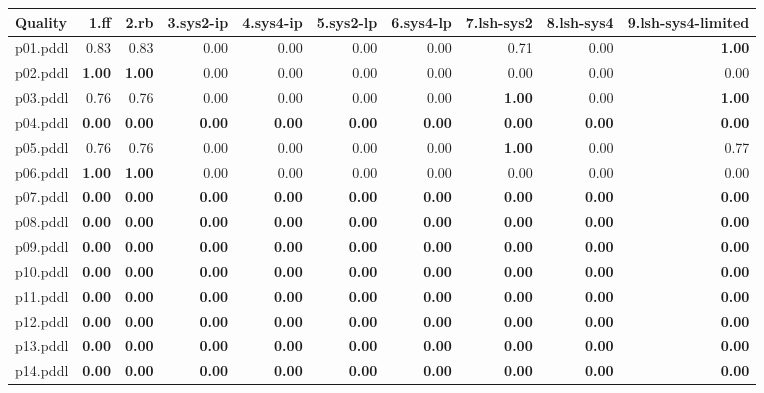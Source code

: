 \documentclass{article}
\begin{document}
\begin{tabular}{@{}lrrrrrrrrr@{}}
Quality & 1.ff & 2.rb & 3.sys2-ip & 4.sys4-ip & 5.sys2-lp & 6.sys4-lp & 7.lsh-sys2 & 8.lsh-sys4 & 9.lsh-sys4-limited \\
\midrule
p01.pddl & 0.83 & 0.83 & 0.00 & 0.00 & 0.00 & 0.00 & 0.71 & 0.00 & \textbf{1.00} \\
p02.pddl & \textbf{1.00} & \textbf{1.00} & 0.00 & 0.00 & 0.00 & 0.00 & 0.00 & 0.00 & 0.00 \\
p03.pddl & 0.76 & 0.76 & 0.00 & 0.00 & 0.00 & 0.00 & \textbf{1.00} & 0.00 & \textbf{1.00} \\
p04.pddl & \textbf{0.00} & \textbf{0.00} & \textbf{0.00} & \textbf{0.00} & \textbf{0.00} & \textbf{0.00} & \textbf{0.00} & \textbf{0.00} & \textbf{0.00} \\
p05.pddl & 0.76 & 0.76 & 0.00 & 0.00 & 0.00 & 0.00 & \textbf{1.00} & 0.00 & 0.77 \\
p06.pddl & \textbf{1.00} & \textbf{1.00} & 0.00 & 0.00 & 0.00 & 0.00 & 0.00 & 0.00 & 0.00 \\
p07.pddl & \textbf{0.00} & \textbf{0.00} & \textbf{0.00} & \textbf{0.00} & \textbf{0.00} & \textbf{0.00} & \textbf{0.00} & \textbf{0.00} & \textbf{0.00} \\
p08.pddl & \textbf{0.00} & \textbf{0.00} & \textbf{0.00} & \textbf{0.00} & \textbf{0.00} & \textbf{0.00} & \textbf{0.00} & \textbf{0.00} & \textbf{0.00} \\
p09.pddl & \textbf{0.00} & \textbf{0.00} & \textbf{0.00} & \textbf{0.00} & \textbf{0.00} & \textbf{0.00} & \textbf{0.00} & \textbf{0.00} & \textbf{0.00} \\
p10.pddl & \textbf{0.00} & \textbf{0.00} & \textbf{0.00} & \textbf{0.00} & \textbf{0.00} & \textbf{0.00} & \textbf{0.00} & \textbf{0.00} & \textbf{0.00} \\
p11.pddl & \textbf{0.00} & \textbf{0.00} & \textbf{0.00} & \textbf{0.00} & \textbf{0.00} & \textbf{0.00} & \textbf{0.00} & \textbf{0.00} & \textbf{0.00} \\
p12.pddl & \textbf{0.00} & \textbf{0.00} & \textbf{0.00} & \textbf{0.00} & \textbf{0.00} & \textbf{0.00} & \textbf{0.00} & \textbf{0.00} & \textbf{0.00} \\
p13.pddl & \textbf{0.00} & \textbf{0.00} & \textbf{0.00} & \textbf{0.00} & \textbf{0.00} & \textbf{0.00} & \textbf{0.00} & \textbf{0.00} & \textbf{0.00} \\
p14.pddl & \textbf{0.00} & \textbf{0.00} & \textbf{0.00} & \textbf{0.00} & \textbf{0.00} & \textbf{0.00} & \textbf{0.00} & \textbf{0.00} & \textbf{0.00} \\

\end{tabular}
\end{document}
